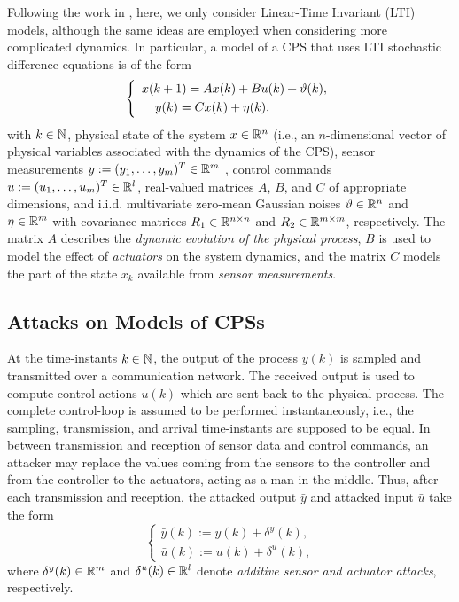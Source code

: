 {Following the work in \cite{CPSAttacksAgainstPCS,Urbina2016,CPSDetectingIntegrityAttacksScada,CPSIntegrityAttacks,Carlos_Justin1,Carlos_Justin2,ReachableSets}, here, we only consider Linear-Time Invariant (LTI) models, although the same ideas are employed when considering more complicated dynamics. In particular, a model of a CPS that uses LTI stochastic difference equations is of the form
\begin{equation}
\left\{
\begin{array}{ll}
{x}({k+1}) = Ax(k) + B u(k) + \vartheta(k),  \label{1} \\[1mm]
\hspace{3.8mm} y(k) = Cx(k) + \eta(k),
\end{array}
\right.
\end{equation}
with $k\in \mathbb{N}$, physical state of the system $x \in \mathbb{R}^n$ (i.e., an $n$-dimensional vector of physical variables associated with the dynamics of the CPS), sensor measurements $y := (y_1,\ldots,y_m)^T \in \mathbb{R}^m$ , control commands $u := (u_1,\ldots,u_m)^T \in \mathbb{R}^l$, real-valued matrices $A$, $B$, and $C$ of appropriate dimensions, and i.i.d. multivariate zero-mean Gaussian noises $\vartheta \in \mathbb{R}^n$ and $\eta \in \mathbb{R}^m$ with covariance matrices $R_{1} \in \mathbb{R}^{n \times n}$ and $R_2 \in \mathbb{R}^{m \times m}$, respectively. The matrix $A$ describes the \emph{dynamic evolution of the physical process}, $B$ is used to model the effect of \emph{actuators} on the system dynamics, and the matrix $C$ models the part of the state $x_k$ available from \emph{sensor measurements}.

\subsection{Attacks on Models of CPSs}
\label{sec:AttacksOnModels} 
At the time-instants $k \in \mathbb{N}$, the output of the process $y(k)$ is sampled and transmitted over a communication network. The received output is used to compute control actions $u(k)$ which are sent back to the physical process. The complete control-loop is assumed to be performed instantaneously, i.e., the sampling, transmission, and arrival time-instants are supposed to be equal.
In between transmission and reception of sensor data and control commands, an attacker may replace the values coming from the sensors to the controller and from the controller to the actuators, acting as a {man-in-the-middle}. Thus, after each transmission and reception, the attacked output $\bar{y}$ and attacked input $\bar{u}$ take the form
\begin{equation}
\left\{
\begin{array}{ll}
\bar{y}(k) := y(k) + \delta^y(k) 
, \label{3}\\[1mm]
\bar{u}(k) := u(k) + \delta^u(k),
\end{array}\right.
\end{equation}
where $\delta^y(k) \in \mathbb{R}^m$ and $\delta^u(k) \in \mathbb{R}^l$ denote \emph{additive sensor and actuator attacks}, respectively.

}
